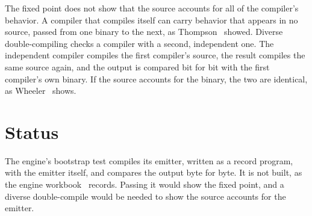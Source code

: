 The fixed point does not show that the source accounts for all of the compiler's behavior. A compiler that compiles itself can carry behavior that appears in no source, passed from one binary to the next, as Thompson~\cite{src:Thompson-1984} showed. Diverse double-compiling checks a compiler with a second, independent one. The independent compiler compiles the first compiler's source, the result compiles the same source again, and the output is compared bit for bit with the first compiler's own binary. If the source accounts for the binary, the two are identical, as Wheeler~\cite{src:Wheeler-2005} shows.

\section{\texorpdfstring{Status}{Status}}

The engine's bootstrap test compiles its emitter, written as a record program, with the emitter itself, and compares the output byte for byte. It is not built, as the engine workbook~\cite{src:Quigg-engine-workbook} records. Passing it would show the fixed point, and a diverse double-compile would be needed to show the source accounts for the emitter.
